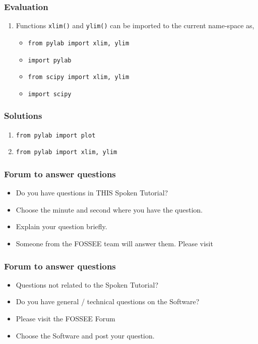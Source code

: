 \documentclass[17pt]{beamer}
\newcounter{saveenumi}
\newcommand{\conti}{\setcounter{enumi}{\value{saveenumi}}}
\begin{document}
\begin{frame}
\frametitle{Evaluation}
\label{sec-16.1}

\begin{enumerate}
\conti
\item Functions \texttt{xlim()} and \texttt{ylim()} can be imported to the current
   name-space as,\pause
	\begin{itemize}
	\item \texttt{from pylab import xlim, ylim}
	\item \texttt{import pylab}
	\item \texttt{from scipy import xlim, ylim}
	\item \texttt{import scipy}
	\end{itemize}
\end{enumerate}
\end{frame}
\begin{frame}
\frametitle{Solutions}
\label{sec-17}

\begin{enumerate}
\item \texttt{from pylab import plot}\pause
\vspace{12pt}
\item \texttt{from pylab import xlim, ylim}
\end{enumerate}
\end{frame}
\begin{frame}
	\frametitle{Forum to answer questions}
	\begin{itemize}
		\item Do you have questions in THIS Spoken Tutorial?
		\item Choose the minute and second where you have the question.
		\item Explain your question briefly.
		\item Someone from the FOSSEE team will answer them. Please visit 
	\end{itemize}
	\begin{center}
		{\color{blue}{http://forums.spoken-tutorial.org/}}
	\end{center} 
\end{frame}
\begin{frame}
	\frametitle{Forum to answer questions}
	\begin{itemize}
		\item Questions not related to the Spoken Tutorial?
		\item Do you have general / technical questions on the Software?
		\item Please visit the FOSSEE Forum
		\begin{center}
			{\color{blue}{http://forums.fossee.in/}}
		\end{center}
		\item Choose the Software and post your question.
	\end{itemize}
\end{frame}
\end{document}
